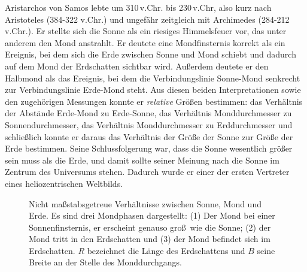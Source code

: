 Aristarchos von Samos 
lebte um 310\,v.Chr. bis 230\,v.Chr, also kurz nach Aristoteles (384-322 v.Chr.)
und ungef\"ahr zeitgleich mit Archimedes (284-212\,v.Chr.). Er stellte sich die Sonne als ein riesiges
Himmelsfeuer vor, das unter anderem den Mond anstrahlt. Er deutete eine Mondfinsternis
korrekt als ein Ereignis, bei dem sich die Erde zwischen Sonne und Mond schiebt und dadurch
auf dem Mond der Erdschatten sichtbar wird. Au\ss erdem deutete er den Halbmond als das Ereignis,
bei dem die Verbindungslinie Sonne-Mond senkrecht zur Verbindungslinie Erde-Mond steht. Aus diesen
beiden Interpretationen sowie den zugeh\"origen Messungen konnte er \textit{relative} Gr\"o\ss en
bestimmen: das Verh\"altnis der Abst\"ande Erde-Mond zu Erde-Sonne, das Verh\"altnis Monddurchmesser zu
Sonnendurchmesser, das Verh\"altnis Monddurchmesser zu Erddurchmesser und schlie\ss lich
konnte er daraus das Verh\"altnis der Gr\"o\ss e der Sonne zur Gr\"o\ss e der Erde bestimmen. Seine
Schlussfolgerung war, dass die Sonne wesentlich gr\"o\ss er sein muss als die Erde, und damit sollte
seiner Meinung nach die Sonne im Zentrum des Universums stehen. Dadurch wurde er einer der ersten
Vertreter eines heliozentrischen Weltbilds.

\begin{figure}[htb]
\caption{\label{fig_Arist}%
Nicht ma\ss stabsgetreue Verh\"altnisse zwischen Sonne, Mond und Erde. Es sind drei
Mondphasen dargestellt: (1) Der Mond bei einer Sonnenfinsternis, er erscheint genauso gro\ss\ wie die
Sonne; (2) der Mond tritt in den Erdschatten und (3) der Mond befindet sich
im Erdschatten. $R$ bezeichnet die L\"ange des Erdschattens und $B$ seine Breite an der Stelle
des Monddurchgangs.}
\end{figure}


